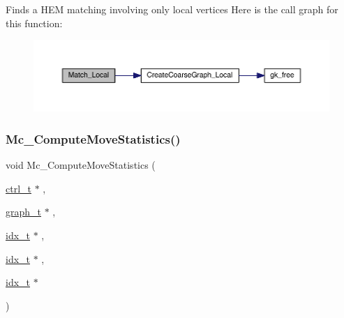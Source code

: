 Finds a H\+EM matching involving only local vertices Here is the call graph for this function\+:\nopagebreak
\begin{figure}[H]
\begin{center}
\leavevmode
\includegraphics[width=350pt]{a00951_a590439d0c0ae8d57d32bbd468b283345_cgraph}
\end{center}
\end{figure}
\mbox{\label{a00951_ada2830ee390c9e4a693b86662cf46b8f}} 
\subsubsection{\texorpdfstring{Mc\+\_\+\+Compute\+Move\+Statistics()}{Mc\_ComputeMoveStatistics()}}
{\footnotesize\ttfamily void Mc\+\_\+\+Compute\+Move\+Statistics (\begin{DoxyParamCaption}\item[{\hyperlink{a00742}{ctrl\+\_\+t} $\ast$}]{,  }\item[{\hyperlink{a00734}{graph\+\_\+t} $\ast$}]{,  }\item[{\hyperlink{a00876_aaa5262be3e700770163401acb0150f52}{idx\+\_\+t} $\ast$}]{,  }\item[{\hyperlink{a00876_aaa5262be3e700770163401acb0150f52}{idx\+\_\+t} $\ast$}]{,  }\item[{\hyperlink{a00876_aaa5262be3e700770163401acb0150f52}{idx\+\_\+t} $\ast$}]{ }\end{DoxyParamCaption})}

